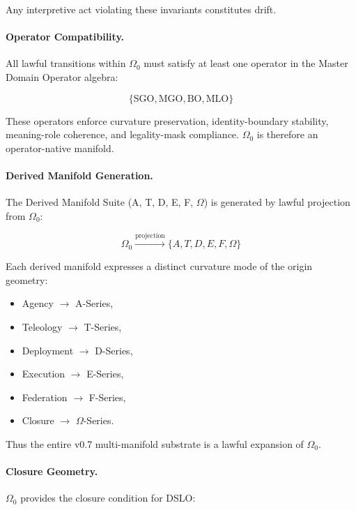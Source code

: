 Any interpretive act violating these invariants constitutes drift.

\paragraph{Operator Compatibility.}
All lawful transitions within $\Omega_0$ must satisfy at least one operator in the Master
Domain Operator algebra:



\[
\{ \text{SGO}, \text{MGO}, \text{BO}, \text{MLO} \}
\]



These operators enforce curvature preservation, identity-boundary stability,
meaning-role coherence, and legality-mask compliance. $\Omega_0$ is therefore an
operator-native manifold.

\paragraph{Derived Manifold Generation.}
The Derived Manifold Suite (A, T, D, E, F, $\Omega$) is generated by lawful projection
from $\Omega_0$:



\[
\Omega_0 \xrightarrow{\text{projection}} \{A, T, D, E, F, \Omega\}
\]



Each derived manifold expresses a distinct curvature mode of the origin geometry:

\begin{itemize}[leftmargin=1.2cm]
    \item Agency $\rightarrow$ A-Series,
    \item Teleology $\rightarrow$ T-Series,
    \item Deployment $\rightarrow$ D-Series,
    \item Execution $\rightarrow$ E-Series,
    \item Federation $\rightarrow$ F-Series,
    \item Closure $\rightarrow$ $\Omega$-Series.
\end{itemize}

Thus the entire v0.7 multi-manifold substrate is a lawful expansion of $\Omega_0$.

\paragraph{Closure Geometry.}
$\Omega_0$ provides the closure condition for DSLO:




